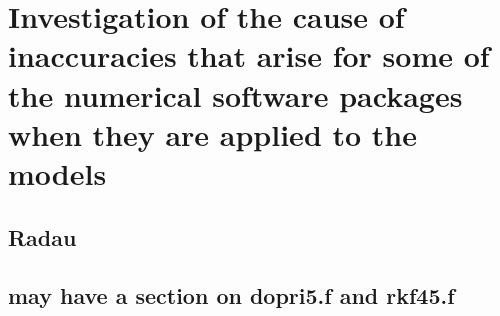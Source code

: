 
\section{Investigation of the cause of inaccuracies that arise for some of the numerical software packages when they are applied to the models}
\label{section:fortran_inaccuracies}
\subsection{Radau}

\subsection{may have a section on dopri5.f and rkf45.f}

